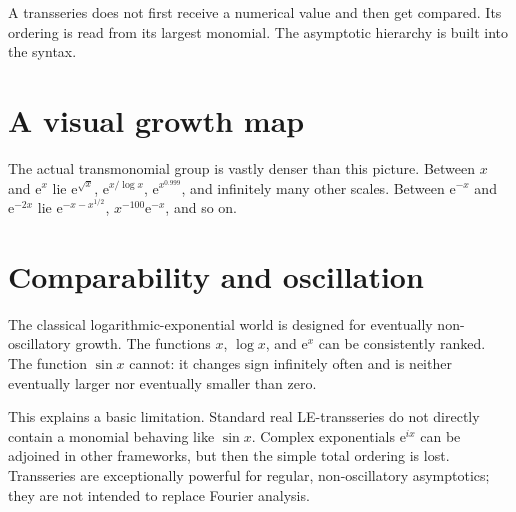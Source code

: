 \documentclass[11pt,openany]{book}
\theoremstyle{plain}
\theoremstyle{definition}
\theoremstyle{remark}
\newcommand{\e}{\mathrm{e}}
\begin{document}
\begin{ideabox}
A transseries does not first receive a numerical value and then get compared. Its ordering is read from its largest monomial. The asymptotic hierarchy is built into the syntax.
\end{ideabox}

\section{A visual growth map}
\begin{center}
\end{center}

The actual transmonomial group is vastly denser than this picture. Between $x$ and $\e^x$ lie $\e^{\sqrt{x}}$, $\e^{x/\log x}$, $\e^{x^{0.999}}$, and infinitely many other scales. Between $\e^{-x}$ and $\e^{-2x}$ lie $\e^{-x-x^{1/2}}$, $x^{-100}\e^{-x}$, and so on.

\section{Comparability and oscillation}
The classical logarithmic-exponential world is designed for eventually non-oscillatory growth. The functions $x$, $\log x$, and $\e^x$ can be consistently ranked. The function $\sin x$ cannot: it changes sign infinitely often and is neither eventually larger nor eventually smaller than zero.

This explains a basic limitation. Standard real LE-transseries do not directly contain a monomial behaving like $\sin x$. Complex exponentials $\e^{ix}$ can be adjoined in other frameworks, but then the simple total ordering is lost. Transseries are exceptionally powerful for regular, non-oscillatory asymptotics; they are not intended to replace Fourier analysis.
\end{document}
